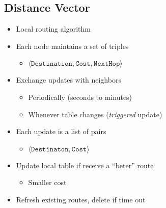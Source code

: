 \subsection{Distance Vector}
\begin{itemize}[nosep]
    \item Local routing algorithm
    \item Each  node maintains a set of triples
          \begin{itemize}[nosep]
              \item $\langle\texttt{Destination}, \texttt{Cost}, \texttt{NextHop}\rangle$
          \end{itemize}
    \item Exchange updates with neighbors
          \begin{itemize}[nosep]
              \item Periodically (seconds to minutes)
              \item Whenever table changes (\emph{triggered} update)
          \end{itemize}
    \item Each update is a list of pairs
          \begin{itemize}[nosep]
              \item $\langle\texttt{Destinaton}, \texttt{Cost}\rangle$
          \end{itemize}
    \item Update local table if receive a ``beter'' route
          \begin{itemize}[nosep]
              \item Smaller cost
          \end{itemize}
    \item Refresh existing routes, delete if time out
\end{itemize}

